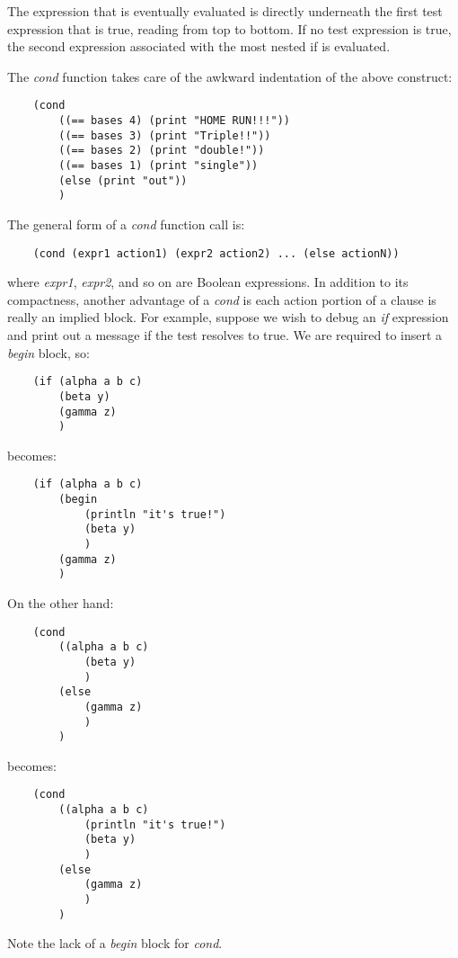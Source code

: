 The expression that is eventually evaluated is
directly underneath the first test expression
that is true, reading from top to bottom.
If no test expression is true, the second expression associated
with the most nested if is evaluated.

The {\it cond} function takes care  of the awkward indentation
of the above construct:

\begin{verbatim}
    (cond
        ((== bases 4) (print "HOME RUN!!!"))
        ((== bases 3) (print "Triple!!"))
        ((== bases 2) (print "double!"))
        ((== bases 1) (print "single"))
        (else (print "out"))
        )
\end{verbatim}

The general form of a {\it cond} function call is:

\begin{verbatim}
    (cond (expr1 action1) (expr2 action2) ... (else actionN))
\end{verbatim}

where {\it expr1}, {\it expr2}, and so on are Boolean expressions. In addition
to its compactness, another advantage of a {\it cond} is each action
portion of a clause is really an implied block. For example,
suppose we wish to debug an {\it if} expression and print out a
message if the test resolves to true. We are required to insert
a {\it begin} block, so:

\begin{verbatim}
    (if (alpha a b c)
        (beta y)
        (gamma z)
        )
\end{verbatim}

becomes:

\begin{verbatim}
    (if (alpha a b c)
        (begin
            (println "it's true!")
            (beta y)
            )
        (gamma z)
        )
\end{verbatim}

On the other hand:

\begin{verbatim}
    (cond
        ((alpha a b c)
            (beta y)
            )
        (else
            (gamma z)
            )
        )
\end{verbatim}

becomes:

\begin{verbatim}
    (cond
        ((alpha a b c)
            (println "it's true!")
            (beta y)
            )
        (else
            (gamma z)
            )
        )
\end{verbatim}

Note the lack of a {\it begin} block for {\it cond}.
